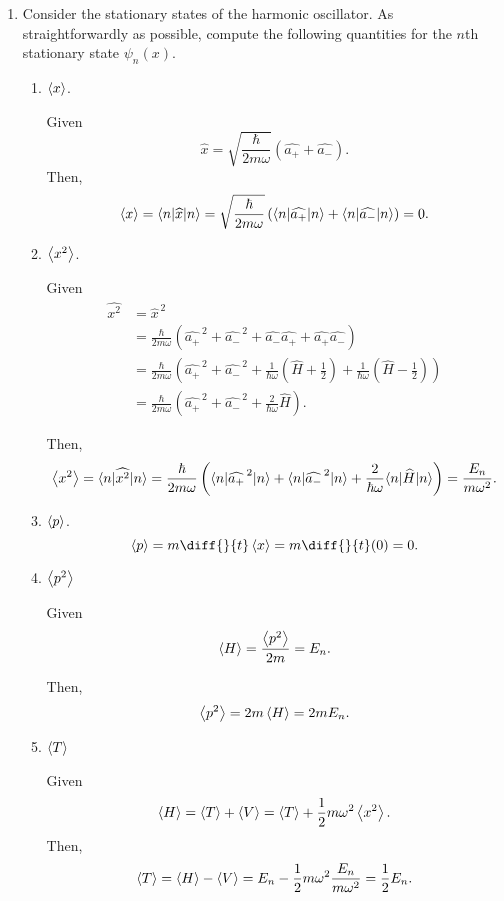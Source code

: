 \documentclass[a4paper, 12pt]{config/homework}
\begin{document}
\begin{enumerate}
\begin{enumerate}[label=(\alph*)]
\end{enumerate}

\pagebreak
\item Consider the stationary states of the harmonic oscillator. As straightforwardly as possible, compute the following quantities for the \(n\)th stationary state \(\psi_n(x)\).
\begin{enumerate}[label=(\alph*)]
\item \(\left\langle x \right\rangle\).

Given
\[\widehat{x} = \sqrt{\frac{\hbar}{2m\omega}}\left(\widehat{a_+} + \widehat{a_-}\right).\]
Then,
\[\expval{x}
= \bra*{n}\widehat{x}\ket*{n}
= \sqrt{\frac{\hbar}{2m\omega}}\left(\bra*{n}\widehat{a_+}\ket*{n} + \bra*{n}\widehat{a_-}\ket*{n}\right)
= 0.\]

\item \(\left\langle x^2 \right\rangle\).

Given
\begin{align*}
\widehat{x^2} &= \widehat{x}^{\,2}
\\&= \frac{\hbar}{2m\omega} \left(\widehat{a_+}^{\,2} + \widehat{a_-}^{\,2} + \widehat{a_-}\widehat{a_+} + \widehat{a_+}\widehat{a_-}\right)
\\&= \frac{\hbar}{2m\omega} \left(\widehat{a_+}^{\,2} + \widehat{a_-}^{\,2} + \frac{1}{\hbar \omega}\left(\widehat{H}+\frac{1}{2}\right) + \frac{1}{\hbar \omega}\left(\widehat{H}-\frac{1}{2}\right)\right)
\\&= \frac{\hbar}{2m\omega} \left(\widehat{a_+}^{\,2} + \widehat{a_-}^{\,2} + \frac{2}{\hbar \omega}\widehat{H}\right).
\end{align*}

Then,
\[\expval{x^2} = \bra*{n}\widehat{x^2}\ket*{n} = \frac{\hbar}{2m\omega} \left( \bra*{n}\widehat{a_+}^{\,2}\ket*{n} + \bra*{n}\widehat{a_-}^{\,2}\ket*{n} + \frac{2}{\hbar \omega}\bra*{n}\widehat{H}\ket*{n}\right) = \frac{E_n}{m\omega^2}.\]

\item \(\left\langle p \right\rangle\).
\[\expval{p} = m\diff{}{t}\expval{x} = m\diff{}{t}(0) = 0.\]

\item \(\left\langle p^2 \right\rangle\)

Given
\[\left\langle H \right\rangle = \frac{\left\langle p^2 \right\rangle}{2m} = E_n.\]

Then,
\[\left\langle p^2 \right\rangle = 2m\left\langle H \right\rangle = 2m E_n.\]

\item \(\left\langle T \right\rangle\)

Given
\[\left\langle H \right\rangle = \left\langle T \right\rangle + \left\langle V \right\rangle = \left\langle T \right\rangle + \frac{1}{2}m\omega^2\left\langle x^2 \right\rangle.\]
Then,
\[\left\langle T \right\rangle = \left\langle H \right\rangle - \left\langle V \right\rangle = E_n - \frac{1}{2}m\omega^2\frac{E_n}{m\omega^2} = \frac{1}{2}E_n.\]


\end{enumerate}
\end{enumerate}
\end{document}

